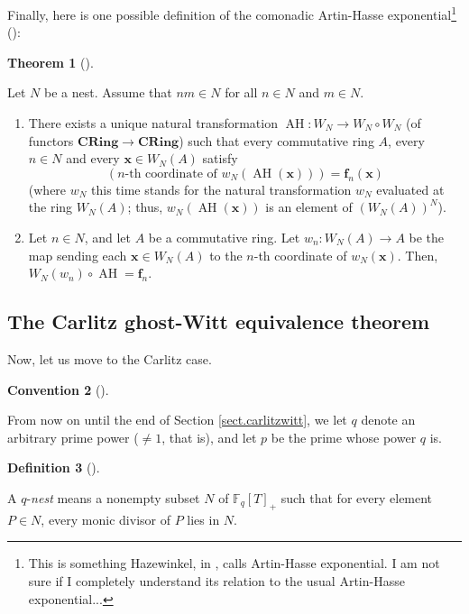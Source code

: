 \documentclass[numbers=enddot,12pt,final,onecolumn,notitlepage]{scrartcl}%
\theoremstyle{definition}
\newtheorem{theo}{Theorem}[section]
\newenvironment{theorem}[1][]
{\begin{theo}[#1]\begin{leftbar}}
{\end{leftbar}\end{theo}}
\newtheorem{defi}[theo]{Definition}
\newenvironment{definition}[1][]
{\begin{defi}[#1]\begin{leftbar}}
{\end{leftbar}\end{defi}}
\newtheorem{conv}[theo]{Convention}
\newenvironment{condition}[1][]
{\begin{conv}[#1]\begin{leftbar}}
{\end{leftbar}\end{conv}}
\begin{document}
Finally, here is one possible definition of the comonadic Artin-Hasse
exponential\footnote{This is something Hazewinkel, in \cite[\S 16.45]%
{hw-witt1}, calls Artin-Hasse exponential. I am not sure if I completely
understand its relation to the usual Artin-Hasse exponential...}
(\cite[Corollary 6.3]{rabinoff-witt}):

\begin{theorem}
\label{thm.Witt.AH}Let $N$ be a nest. Assume that $nm\in N$ for all $n\in N$
and $m\in N$.

\begin{enumerate}
\item[\textbf{(a)}] There exists a unique natural transformation
$\operatorname*{AH}:W_{N}\rightarrow W_{N}\circ W_{N}$ (of functors
$\mathbf{CRing}\rightarrow\mathbf{CRing}$) such that every commutative ring
$A$, every $n\in N$ and every $\mathbf{x}\in W_{N}\left(  A\right)  $ satisfy%
\[
\left(  n\text{-th coordinate of }w_{N}\left(  \operatorname*{AH}\left(
\mathbf{x}\right)  \right)  \right)  =\mathbf{f}_{n}\left(  \mathbf{x}\right)
\]
(where $w_{N}$ this time stands for the natural transformation $w_{N}$
evaluated at the ring $W_{N}\left(  A\right)  $; thus, $w_{N}\left(
\operatorname*{AH}\left(  \mathbf{x}\right)  \right)  $ is an element of
$\left(  W_{N}\left(  A\right)  \right)  ^{N}$).

\item[\textbf{(b)}] Let $n\in N$, and let $A$ be a commutative ring. Let
$w_{n}:W_{N}\left(  A\right)  \rightarrow A$ be the map sending each
$\mathbf{x}\in W_{N}\left(  A\right)  $ to the $n$-th coordinate of
$w_{N}\left(  \mathbf{x}\right)  $. Then, $W_{N}\left(  w_{n}\right)
\circ\operatorname*{AH}=\mathbf{f}_{n}$.
\end{enumerate}
\end{theorem}

\subsection{The Carlitz ghost-Witt equivalence theorem}

Now, let us move to the Carlitz case.

\begin{condition}
From now on until the end of Section \ref{sect.carlitzwitt}, we let $q$ denote
an arbitrary prime power ($\neq1$, that is), and let $p$ be the prime whose
power $q$ is.
\end{condition}

\begin{definition}
\label{def.q-nest}A $q$-\textit{nest} means a nonempty subset $N$ of
$\mathbb{F}_{q}\left[  T\right]  _{+}$ such that for every element $P\in N$,
every monic divisor of $P$ lies in $N$.
\end{definition}
\end{document}
